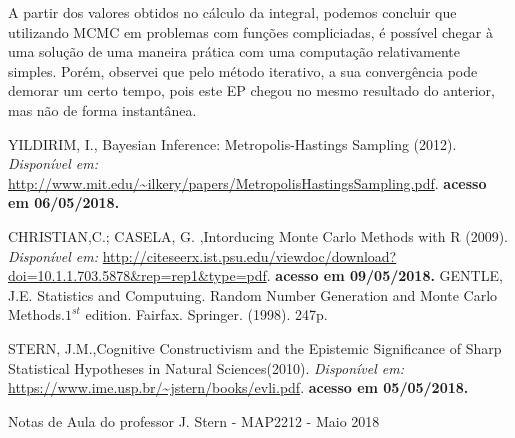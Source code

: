 \documentclass{article} %
\begin{document}
\qquad A partir dos valores obtidos no cálculo da integral, podemos concluir que utilizando MCMC em problemas com funções compliciadas, é possível chegar à uma solução de uma maneira prática com uma computação relativamente simples. Porém, observei que pelo método iterativo, a sua convergência pode demorar um certo tempo, pois este EP chegou no mesmo resultado do anterior, mas não de forma instantânea.

\begin{thebibliography}{refs} %
        YILDIRIM, I., Bayesian Inference: Metropolis-Hastings Sampling (2012).
        \textit{Disponível em:}
        \url{http://www.mit.edu/~ilkery/papers/MetropolisHastingsSampling.pdf}.
        \textbf {acesso em 06/05/2018.}
        
        CHRISTIAN,C.; CASELA, G. ,Intorducing Monte Carlo Methods with R (2009).
        \textit{Disponível em:}
        \url{http://citeseerx.ist.psu.edu/viewdoc/download?doi=10.1.1.703.5878&rep=rep1&type=pdf}.
        \textbf {acesso em 09/05/2018.}
		GENTLE, J.E. Statistics and Computuing. Random Number Generation and Monte Carlo Methods.$1^{st}$ edition. Fairfax. Springer. (1998). 247p.

        STERN, J.M.,Cognitive Constructivism and the Epistemic Significance of Sharp Statistical Hypotheses in Natural Sciences(2010).
        \textit{Disponível em:}
        \url{https://www.ime.usp.br/~jstern/books/evli.pdf}.
        \textbf {acesso em 05/05/2018.}
        
        Notas de Aula do professor J. Stern - MAP2212 - Maio 2018       
\end{thebibliography}
\end{document}
